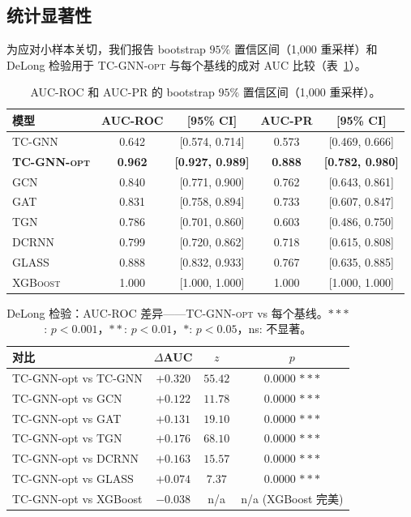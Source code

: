 \documentclass[journal,onecolumn]{IEEEtran}
\begin{document}
\subsection{统计显著性}
\label{sec:exp-stats}

为应对小样本关切，我们报告 bootstrap $95\%$ 置信区间（1{,}000 重采样）和 DeLong 检验用于 \textsc{TC-GNN-opt} 与每个基线的成对 AUC 比较（表~\ref{tab:ci}）。

\begin{table}[t]
\centering
\caption{AUC-ROC 和 AUC-PR 的 bootstrap $95\%$ 置信区间（1{,}000 重采样）。}
\label{tab:ci}
\small
\begin{tabular}{lcccc}
\toprule
\textbf{模型} & \textbf{AUC-ROC} & \textbf{[95\% CI]} & \textbf{AUC-PR} & \textbf{[95\% CI]} \\
\midrule
\textsc{TC-GNN}      & 0.642 & [0.574, 0.714] & 0.573 & [0.469, 0.666] \\
\textbf{\textsc{TC-GNN-opt}} & \textbf{0.962} & \textbf{[0.927, 0.989]} & \textbf{0.888} & \textbf{[0.782, 0.980]} \\
\textsc{GCN}         & 0.840 & [0.771, 0.900] & 0.762 & [0.643, 0.861] \\
\textsc{GAT}         & 0.831 & [0.758, 0.894] & 0.733 & [0.607, 0.847] \\
\textsc{TGN}         & 0.786 & [0.701, 0.860] & 0.603 & [0.486, 0.750] \\
\textsc{DCRNN}       & 0.799 & [0.720, 0.862] & 0.718 & [0.615, 0.808] \\
\textsc{GLASS}       & 0.888 & [0.832, 0.933] & 0.767 & [0.635, 0.885] \\
\textsc{XGBoost}     & 1.000 & [1.000, 1.000] & 1.000 & [1.000, 1.000] \\
\bottomrule
\end{tabular}
\end{table}

\begin{table}[t]
\centering
\caption{DeLong 检验：AUC-ROC 差异——\textsc{TC-GNN-opt} vs 每个基线。$***$: $p < 0.001$，$**$: $p < 0.01$，$*$: $p < 0.05$，ns: 不显著。}
\label{tab:delong}
\small
\begin{tabular}{lccc}
\toprule
\textbf{对比} & $\Delta$\textbf{AUC} & \textbf{$z$} & \textbf{$p$} \\
\midrule
TC-GNN-opt vs TC-GNN       & $+0.320$ & $55.42$ & $0.0000$ $***$ \\
TC-GNN-opt vs GCN          & $+0.122$ & $11.78$ & $0.0000$ $***$ \\
TC-GNN-opt vs GAT          & $+0.131$ & $19.10$ & $0.0000$ $***$ \\
TC-GNN-opt vs TGN          & $+0.176$ & $68.10$ & $0.0000$ $***$ \\
TC-GNN-opt vs DCRNN        & $+0.163$ & $15.57$ & $0.0000$ $***$ \\
TC-GNN-opt vs GLASS        & $+0.074$ & $7.37$  & $0.0000$ $***$ \\
TC-GNN-opt vs XGBoost      & $-0.038$ & n/a     & n/a  (XGBoost 完美) \\
\bottomrule
\end{tabular}
\end{table}
\end{document}
